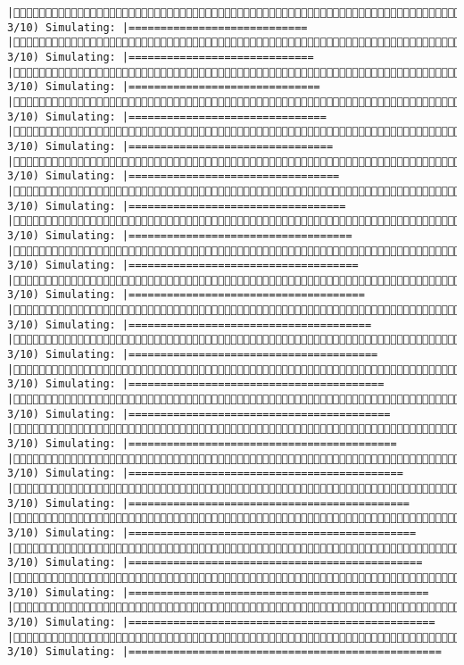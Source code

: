 \documentclass[]{article}
\begin{document}
\begin{verbatim}
|( 3/10) Simulating: |============================                         |( 3/10) Simulating: |=============================                        |( 3/10) Simulating: |==============================                       |( 3/10) Simulating: |===============================                      |( 3/10) Simulating: |================================                     |( 3/10) Simulating: |=================================                    |( 3/10) Simulating: |==================================                   |( 3/10) Simulating: |===================================                  |( 3/10) Simulating: |====================================                 |( 3/10) Simulating: |=====================================                |( 3/10) Simulating: |======================================               |( 3/10) Simulating: |=======================================              |( 3/10) Simulating: |========================================             |( 3/10) Simulating: |=========================================            |( 3/10) Simulating: |==========================================           |( 3/10) Simulating: |===========================================          |( 3/10) Simulating: |============================================         |( 3/10) Simulating: |=============================================        |( 3/10) Simulating: |==============================================       |( 3/10) Simulating: |===============================================      |( 3/10) Simulating: |================================================     |( 3/10) Simulating: |=================================================    
\end{verbatim}
\end{document}
